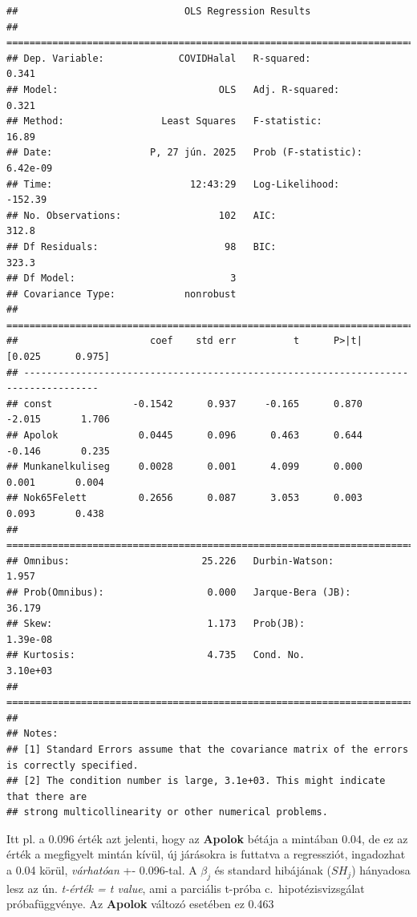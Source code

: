 \documentclass[
]{book}
\begin{document}
\begin{verbatim}
##                             OLS Regression Results                            
## ==============================================================================
## Dep. Variable:             COVIDHalal   R-squared:                       0.341
## Model:                            OLS   Adj. R-squared:                  0.321
## Method:                 Least Squares   F-statistic:                     16.89
## Date:                 P, 27 jún. 2025   Prob (F-statistic):           6.42e-09
## Time:                        12:43:29   Log-Likelihood:                -152.39
## No. Observations:                 102   AIC:                             312.8
## Df Residuals:                      98   BIC:                             323.3
## Df Model:                           3                                         
## Covariance Type:            nonrobust                                         
## ===================================================================================
##                       coef    std err          t      P>|t|      [0.025      0.975]
## -----------------------------------------------------------------------------------
## const              -0.1542      0.937     -0.165      0.870      -2.015       1.706
## Apolok              0.0445      0.096      0.463      0.644      -0.146       0.235
## Munkanelkuliseg     0.0028      0.001      4.099      0.000       0.001       0.004
## Nok65Felett         0.2656      0.087      3.053      0.003       0.093       0.438
## ==============================================================================
## Omnibus:                       25.226   Durbin-Watson:                   1.957
## Prob(Omnibus):                  0.000   Jarque-Bera (JB):               36.179
## Skew:                           1.173   Prob(JB):                     1.39e-08
## Kurtosis:                       4.735   Cond. No.                     3.10e+03
## ==============================================================================
## 
## Notes:
## [1] Standard Errors assume that the covariance matrix of the errors is correctly specified.
## [2] The condition number is large, 3.1e+03. This might indicate that there are
## strong multicollinearity or other numerical problems.
\end{verbatim}

Itt pl. a \(0.096\) érték azt jelenti, hogy az \textbf{Apolok} bétája a mintában 0.04, de ez az érték a megfigyelt mintán kívül, új járásokra is futtatva a regressziót, ingadozhat a 0.04 körül, \emph{várhatóan} +- 0.096-tal. A \(\beta_j\) és standard hibájának (\(SH_j\)) hányadosa lesz az ún. \emph{t-érték = t value}, ami a parciális t-próba c.~hipotézisvizsgálat próbafüggvénye. Az \textbf{Apolok} változó esetében ez 0.463
\end{document}
